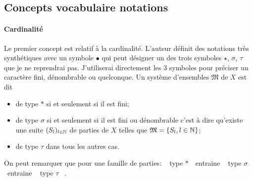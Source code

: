 \subsection{Concepts vocabulaire notations}\label{SubSec:ConcVocNot}

\paragraph{Cardinalité}
Le premier concept est relatif à la cardinalité. L'auteur définit des notations très synthétiques avec un symbole $\bullet$ qui peut  désigner un des trois symboles $\star$, $\sigma$, $\tau$ que je ne reprendrai pas. J'utiliserai directement les 3 symboles pour préciser un caractère fini, dénombrable ou quelconque.\newline
Un système d'ensembles $\mathfrak{M}$ de $X$ est dit
\begin{itemize}
 \item de type $*$ si et seulement si il est fini;
 \item de type $\sigma$ si et seulement si il est fini ou dénombrable c'est à dire qu'existe une suite $(S_l)_{l\in \mathbb{N}}$ de parties de $X$ telles que $\mathfrak{M}= \left\lbrace S_l , l\in \mathbb{N} \right\rbrace$;
 \item de type $\tau$ dans tous les autres cas.
\end{itemize}
On peut remarquer que pour une famille de parties: \og~ type $*$~\fg{}\, entraine \og~ type $\sigma$ ~\fg{} \, entraine \og~ type $\tau$ ~\fg{}.

